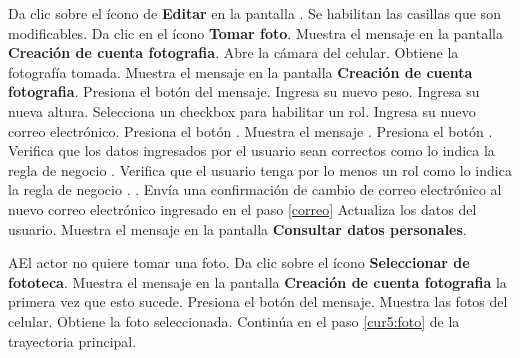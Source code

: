  \begin{UCtrayectoria}
 	
 	\UCpaso [\UCactor] Da clic sobre el ícono de \textbf{Editar} en la pantalla .
 	\UCpaso Se habilitan las casillas que son modificables. 	
 	\UCpaso [\UCactor] Da clic en el ícono \textbf{Tomar foto}. 
 	\UCpaso Muestra el mensaje  en la pantalla \textbf{Creación de cuenta fotografia}.
 	\UCpaso Abre la cámara del celular.\label{cur:otrafoto}
 	\UCpaso Obtiene la fotografía tomada.
 	\UCpaso Muestra el mensaje  en la pantalla \textbf{Creación de cuenta fotografia}.
 	\UCpaso [\UCactor] Presiona el botón  del mensaje.
 	\UCpaso [\UCactor] Ingresa su nuevo peso.\label{cur5:foto}
 	\UCpaso [\UCactor] Ingresa su nueva altura.
 	\UCpaso [\UCactor] Selecciona un checkbox para habilitar un rol.   \label{roles}
 	\UCpaso [\UCactor] Ingresa su nuevo correo electrónico.  \label{correo}
 	\UCpaso [\UCactor] Presiona el botón .
 	\UCpaso Muestra el mensaje .
 	\UCpaso [\UCactor] Presiona el botón .
 	\UCpaso Verifica que los datos ingresados por el usuario sean correctos como lo indica la regla de negocio . 
 	\UCpaso Verifica que el usuario tenga por lo menos un rol como lo indica la regla de negocio . .
 	\UCpaso Envía una confirmación de cambio de correo electrónico al nuevo correo electrónico ingresado en el paso \ref{correo}
 	\UCpaso Actualiza los datos del usuario.
 	\UCpaso Muestra el mensaje  en la pantalla \textbf{Consultar datos personales}.
 	
 	 
 	

 \end{UCtrayectoria}

 \begin{UCtrayectoriaA}{A}{El actor no quiere tomar una foto.}
 	\UCpaso [\UCactor] Da clic sobre el ícono \textbf{Seleccionar de fototeca}.
 	\UCpaso Muestra el mensaje  en la pantalla \textbf{Creación de cuenta fotografia} la primera vez que esto sucede.
 	\UCpaso [\UCactor] Presiona el botón  del mensaje.
 	\UCpaso Muestra las fotos del celular.
 	\UCpaso Obtiene la foto seleccionada.
 	\UCpaso Continúa en el paso \ref{cur5:foto} de la trayectoria principal.
 	
 \end{UCtrayectoriaA}

